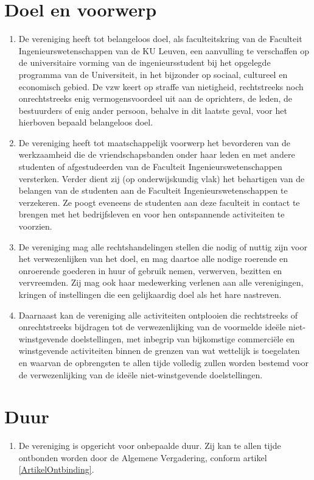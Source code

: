     \section{Doel en voorwerp}
    \begin{enumerate}
    \item De vereniging heeft tot belangeloos doel, als faculteitskring van de Faculteit Ingenieurswetenschappen van de KU Leuven, een aanvulling te verschaffen op de universitaire vorming van de ingenieursstudent bij het opgelegde programma van de Universiteit, in het bijzonder op sociaal, cultureel en economisch gebied. De vzw keert op straffe van nietigheid, rechtstreeks noch onrechtstreeks enig vermogensvoordeel uit aan de oprichters, de leden, de bestuurders of enig ander persoon, behalve in dit laatste geval, voor het hierboven bepaald belangeloos doel.
    \item De vereniging heeft tot maatschappelijk voorwerp het bevorderen van de werkzaamheid die de vriendschapsbanden onder haar leden en met andere studenten of afgestudeerden van de Faculteit Ingenieurswetenschappen versterken. Verder dient zij (op onderwijskundig vlak) het behartigen van de belangen van de studenten aan de Faculteit Ingenieurswetenschappen te verzekeren. Ze poogt eveneens de studenten aan deze faculteit in contact te brengen met het bedrijfsleven en voor hen ontspannende activiteiten te voorzien.
    \item De vereniging mag alle rechtshandelingen stellen die nodig of nuttig zijn voor het verwezenlijken van het doel, en mag daartoe alle nodige roerende en onroerende goederen in huur of gebruik nemen, verwerven, bezitten en vervreemden. Zij mag ook haar medewerking verlenen aan alle verenigingen, kringen of instellingen die een gelijkaardig doel als het hare nastreven.
    \item Daarnaast kan de vereniging alle activiteiten ontplooien die rechtstreeks of onrechtstreeks bijdragen tot de verwezenlijking van de voormelde ideële niet-winstgevende doelstellingen, met inbegrip van bijkomstige commerciële en winstgevende activiteiten binnen de grenzen van wat wettelijk is toegelaten en waarvan de opbrengsten te allen tijde volledig zullen worden bestemd voor de verwezenlijking van de ideële niet-winstgevende doelstellingen. 
    \end{enumerate} 
    
    \section{Duur}
    \begin{enumerate}
    \item De vereniging is opgericht voor onbepaalde duur. Zij kan te allen tijde ontbonden worden door de Algemene Vergadering, conform artikel \ref{ArtikelOntbinding}.
    \end{enumerate}
    
